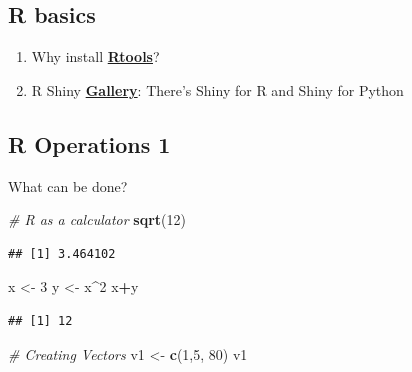 \documentclass[
]{article}
\newenvironment{Shaded}{\begin{snugshade}}{\end{snugshade}}
\newcommand{\CommentTok}[1]{\textcolor[rgb]{0.56,0.35,0.01}{\textit{#1}}}
\newcommand{\DecValTok}[1]{\textcolor[rgb]{0.00,0.00,0.81}{#1}}
\newcommand{\FunctionTok}[1]{\textcolor[rgb]{0.13,0.29,0.53}{\textbf{#1}}}
\newcommand{\NormalTok}[1]{#1}
\newcommand{\OtherTok}[1]{\textcolor[rgb]{0.56,0.35,0.01}{#1}}
\newcommand{\SpecialCharTok}[1]{\textcolor[rgb]{0.81,0.36,0.00}{\textbf{#1}}}
\begin{document}
\subsection{R basics}\label{r-basics}

\begin{enumerate}
\def\labelenumi{\arabic{enumi}.}
\item
  Why install
  \href{https://cran.r-project.org/bin/windows/Rtools/}{\textbf{Rtools}}?
\item
  R Shiny \href{http://shiny.rstudio.com/gallery/}{\textbf{Gallery}}:
  There's Shiny for R and Shiny for Python
\end{enumerate}

\subsection{R Operations 1}\label{r-operations-1}

What can be done?

\begin{Shaded}
\begin{Highlighting}[]
\CommentTok{\# R as a calculator}
\FunctionTok{sqrt}\NormalTok{(}\DecValTok{12}\NormalTok{)}
\end{Highlighting}
\end{Shaded}

\begin{verbatim}
## [1] 3.464102
\end{verbatim}

\begin{Shaded}
\begin{Highlighting}[]
\NormalTok{x }\OtherTok{\textless{}{-}} \DecValTok{3}
\NormalTok{y }\OtherTok{\textless{}{-}}\NormalTok{ x}\SpecialCharTok{\^{}}\DecValTok{2}
\NormalTok{x}\SpecialCharTok{+}\NormalTok{y}
\end{Highlighting}
\end{Shaded}

\begin{verbatim}
## [1] 12
\end{verbatim}

\begin{Shaded}
\begin{Highlighting}[]
\CommentTok{\# Creating Vectors}
\NormalTok{v1 }\OtherTok{\textless{}{-}} \FunctionTok{c}\NormalTok{(}\DecValTok{1}\NormalTok{,}\DecValTok{5}\NormalTok{, }\DecValTok{80}\NormalTok{)}
\NormalTok{v1}
\end{Highlighting}
\end{Shaded}
\end{document}
